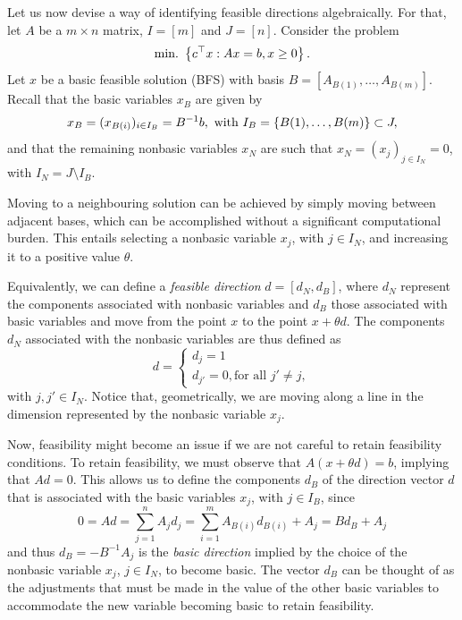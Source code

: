 Let us now devise a way of identifying feasible directions algebraically. For that, let $A$ be a $m \times n$ matrix, $I = [m]$ and $J = [n]$. Consider the problem 
%
\begin{equation*}
	\mathop{\text{min.~}} \left\{ c^\top x : Ax = b, x \geq 0 \right \}.	
\end{equation*}
%
Let $x$ be a basic feasible solution (BFS) with basis $B = [A_{B(1)}, \dots, A_{B(m)}]$. Recall that the basic variables $x_B$ are given by
%
\begin{equation*}
	x_B = (x_{B(i)})_{i \in I_B} = B^{-1}b, \text{ with } I_B = \left\{ B(1), \dots, B(m) \right \} \subset J,	
\end{equation*}
%
and that the remaining nonbasic variables $x_N$ are such that $x_N = (x_j)_{j \in I_N} = 0$, with $I_N = J \setminus I_B$.

Moving to a neighbouring solution can be achieved by simply moving between adjacent bases, which can be accomplished without a significant computational burden. This entails selecting a nonbasic variable $x_j$, with $j \in I_N$, and increasing it to a positive value $\theta$. 

Equivalently, we can define a \emph{feasible direction} $d = [d_N, d_B]$, where $d_N$ represent the components associated with nonbasic variables and $d_B$ those associated with basic variables and move from the point $x$ to the point $x + \theta d$. The components $d_N$ associated with the nonbasic variables are thus defined as 
%
\begin{equation*}
d = \begin{cases} d_j = 1 \\ 
				  d_{j'} = 0, \text{for all } j' \neq j, 
	\end{cases}	
\end{equation*}
%
with $j, j' \in I_N$. Notice that, geometrically, we are moving along a line in the dimension represented by the nonbasic variable $x_j$.

Now, feasibility might become an issue if we are not careful to retain feasibility conditions. To retain feasibility, we must observe that $A(x + \theta d) = b$, implying that $Ad = 0$. This allows us to define the components $d_B$ of the direction vector $d$ that is associated with the basic variables $x_j$, with $j \in I_B$, since
%
\begin{equation*}
	0 = Ad = \sum_{j = 1}^n	A_j d_j = \sum_{i = 1}^m A_{B(i)}d_{B(i)} + A_j = Bd_B + A_j
\end{equation*}
%
and thus $d_B = -B^{-1} A_j$ is the \emph{basic direction} implied by the choice of the nonbasic variable $x_j$, $j \in I_N$, to become basic. The vector $d_B$ can be thought of as the adjustments that must be made in the value of the other basic variables to accommodate the new variable becoming basic to retain feasibility. 

